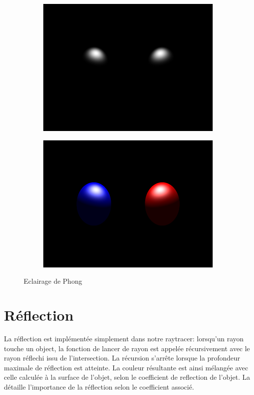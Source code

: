 \documentclass{article}
\begin{document}
\begin{figure}[hb]
  \begin{subfigure}{0.45\textwidth}
    \includegraphics[width=1\textwidth]{images/phong3.png}
  \end{subfigure}
  \begin{subfigure}{0.45\textwidth}
    \includegraphics[width=1\textwidth]{images/phong4.png}
  \end{subfigure}
  \caption{Eclairage de Phong\label{phong}}
\end{figure}


\section{Réflection}
La réflection est implémentée simplement dans notre raytracer: lorsqu'un rayon
touche un object, la fonction de lancer de rayon est appelée récursivement avec
le rayon réflechi issu de l'intersection. La récursion s'arrête lorsque la
profondeur maximale de réflection est atteinte. La couleur résultante est ainsi
mélangée avec celle calculée à la surface de l'objet, selon le coefficient de
reflection de l'objet. La \label{refl} détaille l'importance de la
réflection selon le coefficient associé.
\end{document}
